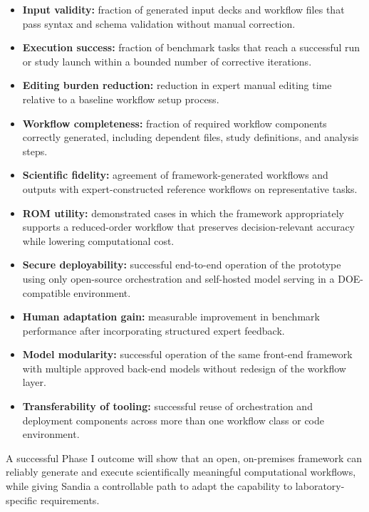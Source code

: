 \documentclass[11pt]{article} \usepackage[margin=1in]{geometry}
\begin{document}
\begin{itemize} \item \textbf{Input validity:} fraction of generated input decks
and workflow files that pass syntax and schema validation without manual
correction.  \item \textbf{Execution success:} fraction of benchmark tasks that
reach a successful run or study launch within a bounded number of corrective
iterations.  \item \textbf{Editing burden reduction:} reduction in expert manual
editing time relative to a baseline workflow setup process.  \item
\textbf{Workflow completeness:} fraction of required workflow components
correctly generated, including dependent files, study definitions, and analysis
steps.  \item \textbf{Scientific fidelity:} agreement of framework-generated
workflows and outputs with expert-constructed reference workflows on
representative tasks.  \item \textbf{ROM utility:} demonstrated cases in which
the framework appropriately supports a reduced-order workflow that preserves
decision-relevant accuracy while lowering computational cost.  \item
\textbf{Secure deployability:} successful end-to-end operation of the prototype
using only open-source orchestration and self-hosted model serving in a
DOE-compatible environment.  \item \textbf{Human adaptation gain:} measurable
improvement in benchmark performance after incorporating structured expert
feedback.  \item \textbf{Model modularity:} successful operation of the same
front-end framework with multiple approved back-end models without redesign of
the workflow layer.  \item \textbf{Transferability of tooling:} successful reuse
of orchestration and deployment components across more than one workflow class
or code environment.  \end{itemize}

A successful Phase I outcome will show that an open, on-premises framework can
reliably generate and execute scientifically meaningful computational workflows,
while giving Sandia a controllable path to adapt the capability to
laboratory-specific requirements.
\end{document}
